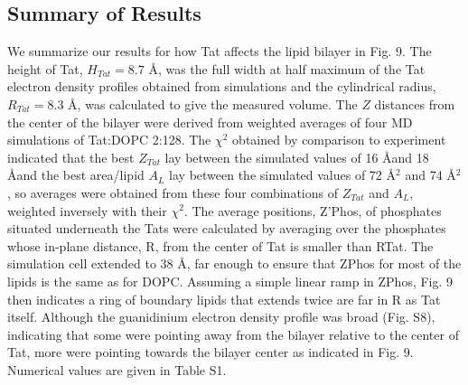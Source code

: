 \subsection{Summary of Results}
We summarize our results for how Tat affects the lipid bilayer in Fig. 9. 
The height of Tat, $H_{Tat} = 8.7$ \AA, was the full width at half maximum of 
the Tat electron density profiles
obtained from simulations and the cylindrical radius, $R_{Tat} = 8.3$ \AA, was 
calculated to give the
measured volume. The $Z$ distances from the center of the bilayer were derived 
from weighted
averages of four MD simulations of Tat:DOPC 2:128. The $\chi^2$ obtained by 
comparison to
experiment indicated that the best $Z_{Tat}$ lay between the simulated values 
of 16 \AA and 18 \AA and
the best area/lipid $A_L$ lay between the simulated values of 72 \AA$^2$ and 
74 \AA$^2$, 
so averages were
obtained from these four combinations of $Z_{Tat}$ and $A_L$, weighted inversely 
with their $\chi^2$. The
average positions, Z'Phos, of phosphates situated underneath the Tats were calculated by
averaging over the phosphates whose in-plane distance, R, from the center of Tat is smaller than
RTat. The simulation cell extended to 38 \AA, far enough to ensure that ZPhos for most of the lipids is
the same as for DOPC. Assuming a simple linear ramp in ZPhos, Fig. 9 then indicates a ring of
boundary lipids that extends twice are far in R as Tat itself. Although the guanidinium electron
density profile was broad (Fig. S8), indicating that some were pointing away from the bilayer
relative to the center of Tat, more were pointing towards the bilayer center as indicated in Fig. 9.
Numerical values are given in Table S1.

